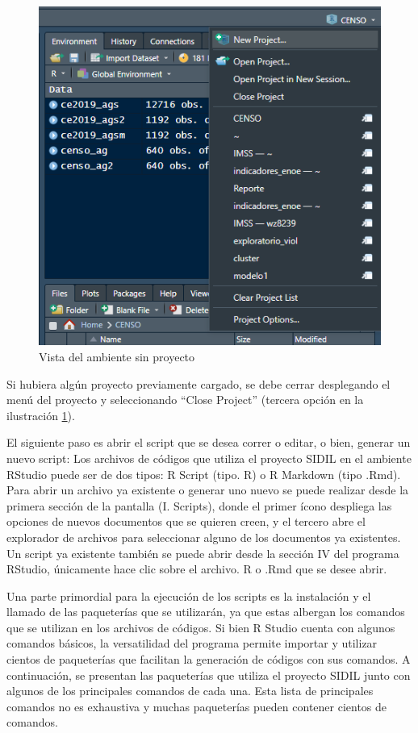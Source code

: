 \documentclass[
]{article}
\begin{document}
\begin{figure}
\includegraphics[width=6.51in]{images-1/06/openproject} \caption{Vista del ambiente sin proyecto}\label{fig:RStudioOpenProject}
\end{figure}

Si hubiera algún proyecto previamente cargado, se debe cerrar desplegando el menú del proyecto y seleccionando ``Close Project'' (tercera opción en la ilustración \ref{fig:RStudioOpenProject}).

El siguiente paso es abrir el script que se desea correr o editar, o bien, generar un nuevo script: Los archivos de códigos que utiliza el proyecto SIDIL en el ambiente RStudio puede ser de dos tipos: R Script (tipo. R) o R Markdown (tipo .Rmd). Para abrir un archivo ya existente o generar uno nuevo se puede realizar desde la primera sección de la pantalla (I. Scripts), donde el primer ícono despliega las opciones de nuevos documentos que se quieren creen, y el tercero abre el explorador de archivos para seleccionar alguno de los documentos ya existentes. Un script ya existente también se puede abrir desde la sección IV del programa RStudio, únicamente hace clic sobre el archivo. R o .Rmd que se desee abrir.

Una parte primordial para la ejecución de los scripts es la instalación y el llamado de las paqueterías que se utilizarán, ya que estas albergan los comandos que se utilizan en los archivos de códigos. Si bien R Studio cuenta con algunos comandos básicos, la versatilidad del programa permite importar y utilizar cientos de paqueterías que facilitan la generación de códigos con sus comandos. A continuación, se presentan las paqueterías que utiliza el proyecto SIDIL junto con algunos de los principales comandos de cada una. Esta lista de principales comandos no es exhaustiva y muchas paqueterías pueden contener cientos de comandos.
\end{document}
